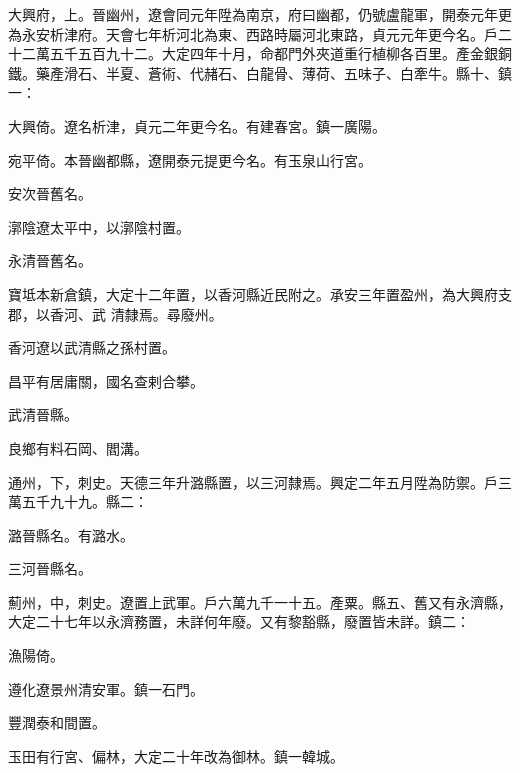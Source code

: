 \begin{pinyinscope}
 大興府，上。晉幽州，遼會同元年陞為南京，府曰幽都，仍號盧龍軍，開泰元年更為永安析津府。天會七年析河北為東、西路時屬河北東路，貞元元年更今名。戶二十二萬五千五百九十二。大定四年十月，命都門外夾道重行植柳各百里。產金銀銅鐵。藥產滑石、半夏、蒼術、代赭石、白龍骨、薄荷、五味子、白牽牛。縣十、鎮一：



 大興倚。遼名析津，貞元二年更今名。有建春宮。鎮一廣陽。



 宛平倚。本晉幽都縣，遼開泰元提更今名。有玉泉山行宮。



 安次晉舊名。



 漷陰遼太平中，以漷陰村置。



 永清晉舊名。



 寶坻本新倉鎮，大定十二年置，以香河縣近民附之。承安三年置盈州，為大興府支郡，以香河、武
 清隸焉。尋廢州。



 香河遼以武清縣之孫村置。



 昌平有居庸關，國名查剌合攀。



 武清晉縣。



 良鄉有料石岡、閻溝。



 通州，下，刺史。天德三年升潞縣置，以三河隸焉。興定二年五月陞為防禦。戶三萬五千九十九。縣二：



 潞晉縣名。有潞水。



 三河晉縣名。



 薊州，中，刺史。遼置上武軍。戶六萬九千一十五。產粟。縣五、舊又有永濟縣，大定二十七年以永濟務置，未詳何年廢。又有黎豁縣，廢置皆未詳。鎮二：



 漁陽倚。



 遵化遼景州清安軍。鎮一石門。



 豐潤泰和間置。



 玉田有行宮、偏林，大定二十年改為御林。鎮一韓城。




\end{pinyinscope}

